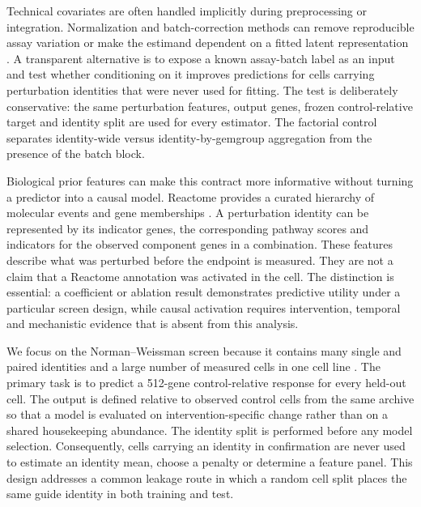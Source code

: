 \documentclass[10pt]{article}
\begin{document}
Technical covariates are often handled implicitly during preprocessing or integration. Normalization and batch-correction methods can remove reproducible assay variation or make the estimand dependent on a fitted latent representation \citep{wolf2018,stuart2019,haghverdi2018,korsunsky2019,gayoso2021,mimitou2019,stoeckius2017,cao2018,pmid34017005,pmid34584091}. A transparent alternative is to expose a known assay-batch label as an input and test whether conditioning on it improves predictions for cells carrying perturbation identities that were never used for fitting. The test is deliberately conservative: the same perturbation features, output genes, frozen control-relative target and identity split are used for every estimator. The factorial control separates identity-wide versus identity-by-gemgroup aggregation from the presence of the batch block.

Biological prior features can make this contract more informative without turning a predictor into a causal model. Reactome provides a curated hierarchy of molecular events and gene memberships \citep{reactome2020,pmid29377902,pmid29378288}. A perturbation identity can be represented by its indicator genes, the corresponding pathway scores and indicators for the observed component genes in a combination. These features describe what was perturbed before the endpoint is measured. They are not a claim that a Reactome annotation was activated in the cell. The distinction is essential: a coefficient or ablation result demonstrates predictive utility under a particular screen design, while causal activation requires intervention, temporal and mechanistic evidence that is absent from this analysis.

We focus on the Norman--Weissman screen because it contains many single and paired identities and a large number of measured cells in one cell line \citep{pmid31395745}. The primary task is to predict a 512-gene control-relative response for every held-out cell. The output is defined relative to observed control cells from the same archive so that a model is evaluated on intervention-specific change rather than on a shared housekeeping abundance. The identity split is performed before any model selection. Consequently, cells carrying an identity in confirmation are never used to estimate an identity mean, choose a penalty or determine a feature panel. This design addresses a common leakage route in which a random cell split places the same guide identity in both training and test.
\end{document}
